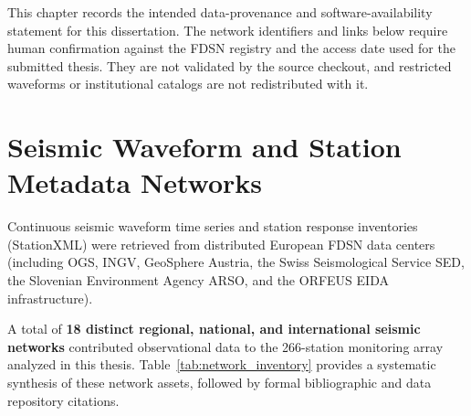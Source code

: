 
\label{chap:data_resources}

This chapter records the intended data-provenance and software-availability statement for this dissertation. The network identifiers and links below require human confirmation against the FDSN registry and the access date used for the submitted thesis. They are not validated by the source checkout, and restricted waveforms or institutional catalogs are not redistributed with it.

\section*{Seismic Waveform and Station Metadata Networks}
Continuous seismic waveform time series and station response inventories (StationXML) were retrieved from distributed European \ac{FDSN} data centers (including OGS, \ac{INGV}, GeoSphere Austria, the Swiss Seismological Service \ac{SED}, the Slovenian Environment Agency \ac{ARSO}, and the \ac{ORFEUS} \ac{EIDA} infrastructure). 

A total of \textbf{18 distinct regional, national, and international seismic networks} contributed observational data to the 266-station monitoring array analyzed in this thesis. Table~\ref{tab:network_inventory} provides a systematic synthesis of these network assets, followed by formal bibliographic and data repository citations.

